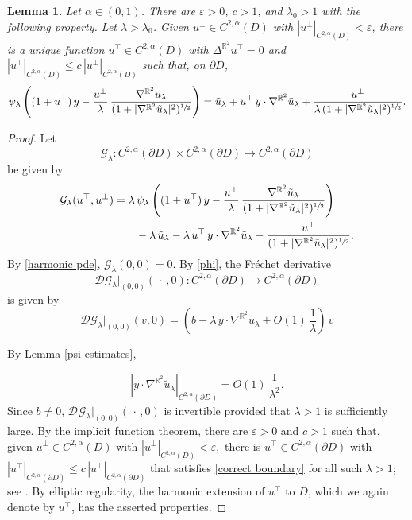 \documentclass[11pt]{amsart}
\newtheorem{lem}[prop]{Lemma}
\begin{document}
\begin{lem} \label{tangential compatibility}
Let $\alpha\in(0,1)$. 
	There are $\varepsilon>0$, $c>1$, and $\lambda_0>1$ with the following property. Let  $\lambda>\lambda_0$.  Given   $u^\perp \in C^{2,\alpha}(D)$ with $|u^\perp|_{C^{2,\alpha}(D)}<\varepsilon$, there is a unique  function $u^\top \in C^{2,\alpha}(D)$ with $\Delta^{\mathbb{R}^2}u^\top=0$ and  $|u^\top|_{C^{2,\alpha}(D)}\leq c\,|u^\perp|_{C^{2,\alpha}(D)}$ such that, on $ \partial D$, 
	\begin{equation}  \label{correct boundary}
		\begin{aligned} 
				\psi_\lambda\left((1+u^\top)\,y-\frac{u^{\perp}}{\lambda }\,\frac{\nabla^{\mathbb{R}^2}\tilde u_\lambda }{(1+|\nabla^{\mathbb{R}^2}\tilde u_\lambda|^2)^{\sfrac12}}\right)
			 =\tilde u_\lambda+u^\top\,y\cdot \nabla^{\mathbb{R}^2}\tilde u_\lambda+\frac{u^\perp}{\lambda\,(1+|\nabla^{\mathbb{R}^2}\tilde u_\lambda|^2)^{\sfrac12}}.
		\end{aligned} 
	\end{equation} 
\end{lem}
\begin{proof}
Let
	$$
	\mathcal{G}_\lambda:C^{2,\alpha}(\partial D)\times C^{2,\alpha}(\partial D)\to C^{2,\alpha}(\partial D)
	$$
be given	by 
	\begin{align*} 
	\mathcal{G}_\lambda(u^\top,u^\perp)&=\lambda\,\psi_\lambda\left((1+u^\top)\,y-\frac{u^{\perp}}{\lambda }\,\frac{\nabla^{\mathbb{R}^2}\tilde u_\lambda }{(1+|\nabla^{\mathbb{R}^2}\tilde u_\lambda|^2)^{\sfrac12}}\right)
	 \\&\qquad -\lambda\,\tilde u_\lambda-\lambda\,u^\top\,y\cdot \nabla^{\mathbb{R}^2}\tilde u_\lambda-\frac{u^\perp}{(1+|\nabla^{\mathbb{R}^2}\tilde u_\lambda|^2)^{\sfrac12}}.
	\end{align*} 
	By \eqref{harmonic pde}, $\mathcal{G}_\lambda(0,0)=0$. By \eqref{phi}, the Fr\'echet derivative
	$$
	\mathcal{D} \mathcal{G}_\lambda|_{(0,0)}{(\,\cdot\,,0)}: C^{2,\alpha}(\partial D)\to C^{2,\alpha}(\partial D)
	$$
	is given by
	$$
	\mathcal{D} {\mathcal{G}}_\lambda|_{(0,0)}{(v,0)}=\left(b-\lambda\,y\cdot \nabla^{\mathbb{R}^2}\tilde u_\lambda+O(1)\,\frac{1}{\lambda}\right)\,v
	$$
	
By Lemma \ref{psi estimates}, 
	
	$$
	|y\cdot \nabla^{\mathbb{R}^2}\tilde u_\lambda|_{C^{2,\alpha}(\partial D)}=O(1)\,\frac{1}{\lambda^2}.
	$$
Since $b\neq 0$, $\mathcal{D}_{} \mathcal{G}_\lambda|_{(0,0)}(\,\cdot\,,0)$ is invertible provided that $\lambda>1$ is sufficiently large. 	By the implicit function theorem, there are $\varepsilon>0$ and $c>1$ such that, given $u^\perp \in C^{2,\alpha}(D)$ with $|u^\perp|_{C^{2,\alpha}(D)}<\varepsilon,$ there is $u^\top \in C^{2,\alpha}(\partial D)$ with $|u^\top|_{C^{2,\alpha}(\partial D)}\leq c\,|u^\perp|_{C^{2,\alpha}(\partial D)}$  that satisfies \eqref{correct boundary} for all such $\lambda>1$; see \cite[Theorem 17.6]{GilbargTrudinger}. By elliptic regularity, the harmonic extension of $u^\top$ to $D$, which we again denote by $u^\top$, has  the asserted properties.
\end{proof}
\end{document}
